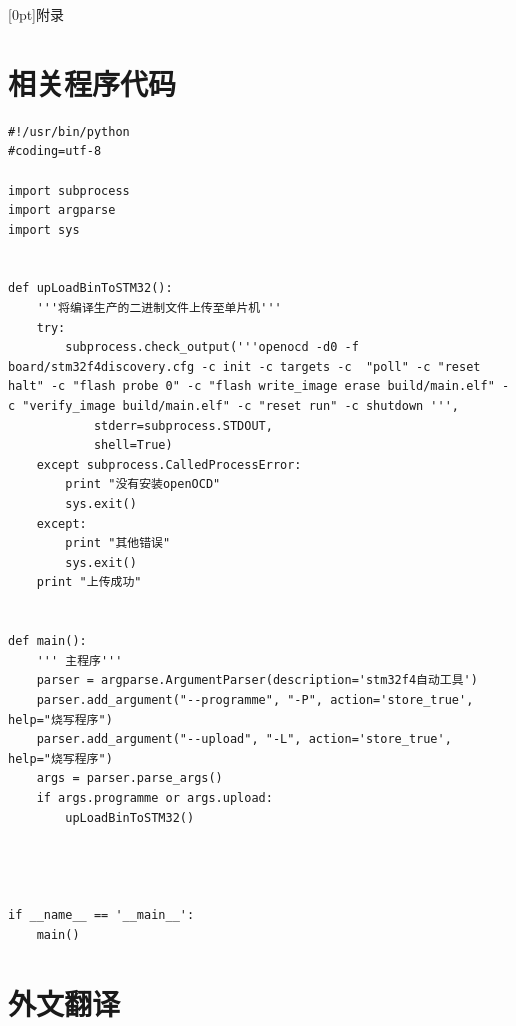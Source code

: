 \documentclass[12pt, a4paper]{article}
\numberwithin{figure}{section}
\numberwithin{table}{section}
\begin{document}
\newpage
\phantom{s}
\thispagestyle{empty}
\clearpage
\newpage
{
\appendix
{}
[0pt]{}{附录\thecontentslabel\, }{}{\titlerule*[10pt]{$\cdot$}\contentspage}
\section{相关程序代码}
\begin{lstlisting}[frame=single, title={ 单片机程序/stm32f4\_auto }]
#!/usr/bin/python
#coding=utf-8

import subprocess
import argparse
import sys


def upLoadBinToSTM32():
	'''将编译生产的二进制文件上传至单片机'''
	try:
		subprocess.check_output('''openocd -d0 -f board/stm32f4discovery.cfg -c init -c targets -c 	"poll" -c "reset halt" -c "flash probe 0" -c "flash write_image erase build/main.elf" -c "verify_image build/main.elf" -c "reset run" -c shutdown ''',
			stderr=subprocess.STDOUT,
			shell=True)
	except subprocess.CalledProcessError:
		print "没有安装openOCD"
		sys.exit()
	except:
		print "其他错误"
		sys.exit()
	print "上传成功"
	

def main():
	''' 主程序'''
	parser = argparse.ArgumentParser(description='stm32f4自动工具')
	parser.add_argument("--programme", "-P", action='store_true', help="烧写程序")
	parser.add_argument("--upload", "-L", action='store_true', help="烧写程序")
	args = parser.parse_args()
	if args.programme or args.upload:
		upLoadBinToSTM32()
	



if __name__ == '__main__':
    main()

\end{lstlisting}
\newpage
{\section{外文翻译}

}}
\end{document}
